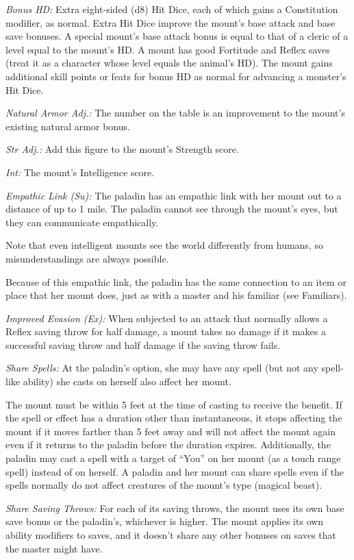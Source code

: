 \documentclass{article}
\begin{document}
\textit{Bonus HD: }Extra eight-sided (d8) Hit Dice, each of which gains a Constitution 
modifier, as normal. Extra Hit Dice improve the mount's base attack and base save 
bonuses. A special mount's base attack bonus is equal to that of a cleric of a 
level equal to the mount's HD. A mount has good Fortitude and Reflex saves (treat 
it as a character whose level equals the animal's HD). The mount gains additional 
skill points or feats for bonus HD as normal for advancing a monster's Hit Dice.

\textit{Natural Armor Adj.: }The number on the table is an improvement to the mount's 
existing natural armor bonus.

\textit{Str Adj.: }Add this figure to the mount's Strength score.

\textit{Int: }The mount's Intelligence score.

\textit{Empathic Link (Su): }The paladin has an empathic link with her mount out 
to a distance of up to 1 mile. The paladin cannot see through the mount's eyes, 
but they can communicate empathically.

Note that even intelligent mounts see the world differently from humans, so misunderstandings 
are always possible.

Because of this empathic link, the paladin has the same connection to an item or 
place that her mount does, just as with a master and his familiar (see Familiars).

\textit{Improved Evasion (Ex): }When subjected to an attack that normally allows 
a Reflex saving throw for half damage, a mount takes no damage if it makes a successful 
saving throw and half damage if the saving throw fails.

\textit{Share Spells: }At the paladin's option, she may have any spell (but not 
any spell-like ability) she casts on herself also affect her mount. 

The mount must be within 5 feet at the time of casting to receive the benefit. 
If the spell or effect has a duration other than instantaneous, it stops affecting 
the mount if it moves farther than 5 feet away and will not affect the mount again 
even if it returns to the paladin before the duration expires. Additionally, the 
paladin may cast a spell with a target of ``You'' on her mount (as a touch range 
spell) instead of on herself. A paladin and her mount can share spells even if 
the spells normally do not affect creatures of the mount's type (magical beast).

\textit{Share Saving Throws: }For each of its saving throws, the mount uses its 
own base save bonus or the paladin's, whichever is higher. The mount applies its 
own ability modifiers to saves, and it doesn't share any other bonuses on saves 
that the master might have.
\end{document}
